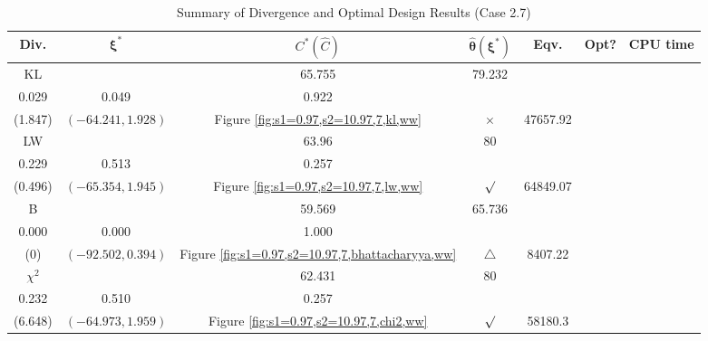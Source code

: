 \documentclass[12pt, a4paper]{article}
\begin{document}
\begin{table}[H]
\centering
\renewcommand{\arraystretch}{1.5} %
\setlength{\tabcolsep}{8pt} %
\begin{tabular}{|c|c|c|c|c|c|c|}
\hline
\textbf{Div.} & \(\boldsymbol{\xi^*}\) & \(C^* (\hat{C})\) & \(\boldsymbol{\hat{\theta}(\xi^*)}\) & \textbf{Eqv.} & \textbf{Opt?} & \textbf{CPU time} \\
\hline
KL & \(\left\{\begin{array}{ccc}
48.575 & 65.755 & 79.232 \\
0.029 & 0.049 & 0.922
\end{array}\right\}\) &
\(\begin{array}{c}
1.847 \\
(1.847)
\end{array}\) & 
\((-64.241, 1.928)\) & 
Figure \ref{fig:s1=0.97,s2=10.97,7,kl,ww} & $\times$ & 47657.92 \\
\hline
LW & \(\left\{\begin{array}{ccc}
49.129 & 63.96 & 80 \\
0.229 & 0.513 & 0.257
\end{array}\right\}\) &
\(\begin{array}{c}
0.496 \\
(0.496)
\end{array}\) & 
\((-65.354, 1.945)\) & 
Figure \ref{fig:s1=0.97,s2=10.97,7,lw,ww} & $\surd$ & 64849.07 \\
\hline
B & \(\left\{\begin{array}{ccc}
31.577 & 59.569 & 65.736 \\
0.000 & 0.000 & 1.000
\end{array}\right\}\) &
\(\begin{array}{c}
0 \\
(0)
\end{array}\) & 
\((-92.502, 0.394)\) & 
Figure \ref{fig:s1=0.97,s2=10.97,7,bhattacharyya,ww} & $\triangle$ & 8407.22 \\
\hline
\(\chi^2\) & \(\left\{\begin{array}{ccc}
46.156 & 62.431 & 80 \\
0.232 & 0.510 & 0.257
\end{array}\right\}\) &
\(\begin{array}{c}
6.648 \\
(6.648)
\end{array}\) & 
\((-64.973, 1.959)\) & 
Figure \ref{fig:s1=0.97,s2=10.97,7,chi2,ww} & $\surd$ & 58180.3 \\
\hline
\end{tabular}
\caption{Summary of Divergence and Optimal Design Results (Case 2.7)}
\label{tab:results2.7}
\end{table}
\end{document}
